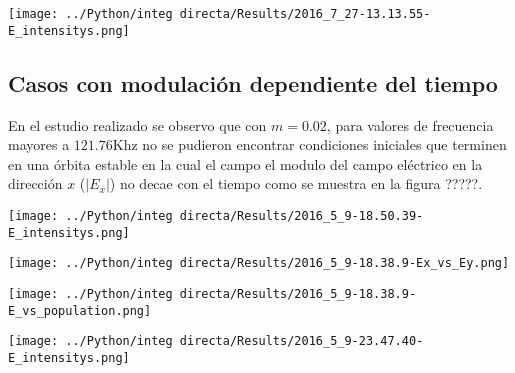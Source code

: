 		\begin{center}
			\texttt{[image: ../Python/integ directa/Results/2016\_7\_27-13.13.55-E\_intensitys.png]}
		\end{center}
		
		
		\subsection{Casos con modulación dependiente del tiempo}
		
			En el estudio realizado se observo que con $m=0.02$, para valores de frecuencia mayores a $121.76 $Khz no se pudieron encontrar condiciones iniciales que terminen en una órbita estable en la cual el campo el modulo del campo eléctrico en la dirección $x$ ($|E_x|$) no decae con el tiempo como se muestra en la figura ?????.
			
			
			\begin{minipage}{0.7\textwidth}
				
				\centering
				\texttt{[image: ../Python/integ directa/Results/2016\_5\_9-18.50.39-E\_intensitys.png]}
				
			\end{minipage}
			
			\begin{minipage}{0.5\textwidth}
				
				\centering
				\texttt{[image: ../Python/integ directa/Results/2016\_5\_9-18.38.9-Ex\_vs\_Ey.png]}
				
			\end{minipage}
			\begin{minipage}{0.5\textwidth}
				
				\centering
				\texttt{[image: ../Python/integ directa/Results/2016\_5\_9-18.38.9-E\_vs\_population.png]}
				
			\end{minipage}
			
			
			
			\begin{minipage}{0.6\textwidth}
				
				\centering
				\texttt{[image: ../Python/integ directa/Results/2016\_5\_9-23.47.40-E\_intensitys.png]}
				
			\end{minipage}
			
